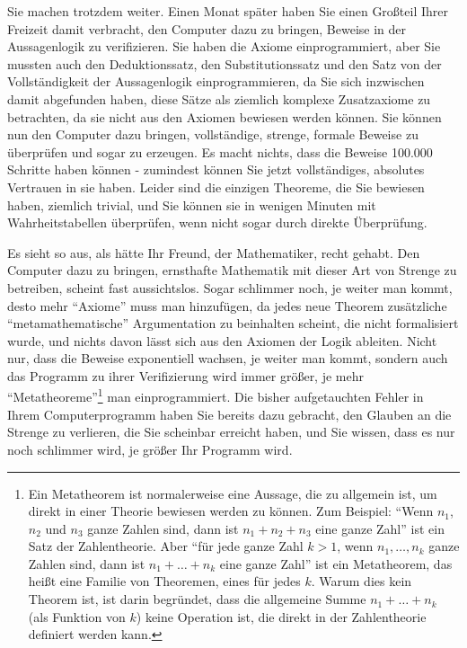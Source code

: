 Sie machen trotzdem weiter.  Einen Monat später haben Sie einen Großteil Ihrer Freizeit damit verbracht, den Computer dazu zu bringen, Beweise in der Aussagenlogik zu verifizieren.
Sie haben die Axiome einprogrammiert, aber Sie mussten auch den Deduktionssatz, den Substitutionssatz und den Satz von der Vollständigkeit der Aussagenlogik einprogrammieren, da Sie sich inzwischen damit abgefunden haben, diese Sätze als ziemlich komplexe Zusatzaxiome zu betrachten, da sie nicht aus den Axiomen bewiesen werden können.  Sie können nun den Computer dazu bringen, vollständige, strenge, formale Beweise zu überprüfen und sogar zu erzeugen.  Es macht nichts, dass die Beweise 100.000 Schritte haben können - zumindest können Sie jetzt vollständiges, absolutes Vertrauen in sie haben.  Leider sind die einzigen Theoreme, die Sie bewiesen haben, ziemlich trivial, und Sie können sie in wenigen Minuten mit Wahrheitstabellen überprüfen, wenn nicht sogar durch direkte Überprüfung.

Es sieht so aus, als hätte Ihr Freund, der Mathematiker, recht gehabt.  Den Computer dazu zu bringen, ernsthafte Mathematik mit dieser Art von Strenge zu betreiben, scheint fast aussichtslos.  Sogar schlimmer noch, je weiter man kommt, desto mehr "`Axiome"' muss man hinzufügen, da jedes neue Theorem zusätzliche "`metamathematische"' Argumentation zu beinhalten scheint, die nicht formalisiert wurde, und nichts davon lässt sich aus den Axiomen der Logik ableiten.  Nicht nur, dass die Beweise exponentiell wachsen, je weiter man kommt, sondern auch das Programm zu ihrer Verifizierung wird immer größer, je mehr "`Metatheoreme"'\footnote{Ein Metatheorem ist normalerweise eine Aussage, die zu allgemein ist, um direkt in einer Theorie bewiesen werden zu können.  Zum Beispiel: "`Wenn $n_1$, $n_2$ und $n_3$ ganze Zahlen sind, dann ist $n_1+n_2+n_3$ eine ganze Zahl"' ist ein Satz der Zahlentheorie.  Aber "`für jede ganze Zahl $k > 1$, wenn $n_1, \ldots, n_k$ ganze Zahlen sind, dann ist $n_1+\ldots +n_k$ eine ganze Zahl"' ist ein Metatheorem, das heißt eine Familie von Theoremen, eines für jedes $k$.  Warum dies kein Theorem ist, ist darin begründet, dass die allgemeine Summe $n_1+\ldots +n_k$ (als Funktion von $k$) keine Operation ist, die direkt in der Zahlentheorie definiert werden kann.} man einprogrammiert. Die bisher aufgetauchten Fehler in Ihrem Computerprogramm haben Sie bereits dazu gebracht, den Glauben an die Strenge zu verlieren, die Sie scheinbar erreicht haben, und Sie wissen, dass es nur noch schlimmer wird, je größer Ihr Programm wird.

